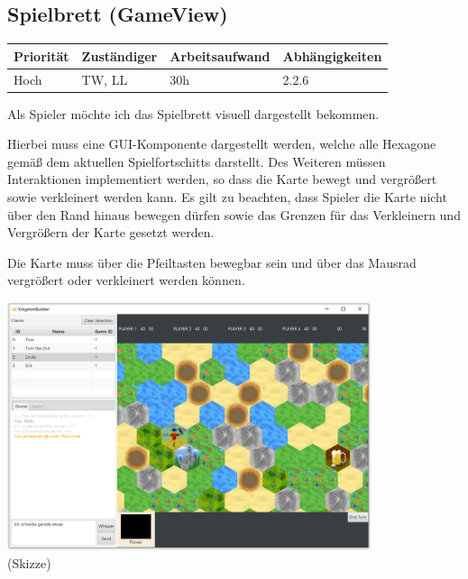 \documentclass[a4paper]{scrreprt}
\newenvironment{requirement}[5] {
	\subsection{#1}
	\begin{tabularx}{\textwidth}{|X|l|X|X|}
		\hline
		Priorität & Zuständiger & Arbeitsaufwand & Abhängigkeiten \\
		\hline
		#2 & #3 & #4 & #5 \\
		\hline
	\end{tabularx}
	}{
	\newpage
	}
\begin{document}
\begin{requirement}{Spielbrett (GameView)}{Hoch}{TW, LL}{30h}{2.2.6}

\begin{center}
	Als Spieler möchte ich das Spielbrett visuell dargestellt bekommen.
\end{center}

Hierbei muss eine GUI-Komponente dargestellt werden, welche alle Hexagone gemäß dem aktuellen Spielfortschitts darstellt. Des Weiteren müssen Interaktionen implementiert werden,
so dass die Karte bewegt und vergrößert sowie verkleinert werden kann. Es gilt zu beachten, dass Spieler die Karte nicht über den Rand hinaus bewegen dürfen sowie das Grenzen für das Verkleinern und Vergrößern der Karte gesetzt werden.

Die Karte muss über die Pfeiltasten bewegbar sein und über das Mausrad vergrößert oder verkleinert werden können.

\begin{center}
	\includegraphics[width=0.8\textwidth]{view5.png}
	\\
	\tiny{(Skizze)}
\end{center}

\end{requirement}
\end{document}
